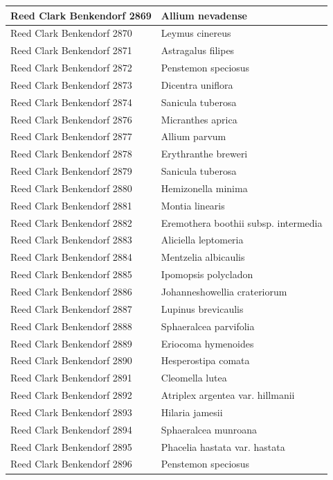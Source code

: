 \documentclass[
]{article}
\begin{document}
\begin{longtable}{l|l}
\hline
Reed Clark Benkendorf 2869 & Allium nevadense\\
\hline
Reed Clark Benkendorf 2870 & Leymus cinereus\\
\hline
Reed Clark Benkendorf 2871 & Astragalus filipes\\
\hline
Reed Clark Benkendorf 2872 & Penstemon speciosus\\
\hline
Reed Clark Benkendorf 2873 & Dicentra uniflora\\
\hline
Reed Clark Benkendorf 2874 & Sanicula tuberosa\\
\hline
Reed Clark Benkendorf 2876 & Micranthes aprica\\
\hline
Reed Clark Benkendorf 2877 & Allium parvum\\
\hline
Reed Clark Benkendorf 2878 & Erythranthe breweri\\
\hline
Reed Clark Benkendorf 2879 & Sanicula tuberosa\\
\hline
Reed Clark Benkendorf 2880 & Hemizonella minima\\
\hline
Reed Clark Benkendorf 2881 & Montia linearis\\
\hline
Reed Clark Benkendorf 2882 & Eremothera boothii subsp. intermedia\\
\hline
Reed Clark Benkendorf 2883 & Aliciella leptomeria\\
\hline
Reed Clark Benkendorf 2884 & Mentzelia albicaulis\\
\hline
Reed Clark Benkendorf 2885 & Ipomopsis polycladon\\
\hline
Reed Clark Benkendorf 2886 & Johanneshowellia crateriorum\\
\hline
Reed Clark Benkendorf 2887 & Lupinus brevicaulis\\
\hline
Reed Clark Benkendorf 2888 & Sphaeralcea parvifolia\\
\hline
Reed Clark Benkendorf 2889 & Eriocoma hymenoides\\
\hline
Reed Clark Benkendorf 2890 & Hesperostipa comata\\
\hline
Reed Clark Benkendorf 2891 & Cleomella lutea\\
\hline
Reed Clark Benkendorf 2892 & Atriplex argentea var. hillmanii\\
\hline
Reed Clark Benkendorf 2893 & Hilaria jamesii\\
\hline
Reed Clark Benkendorf 2894 & Sphaeralcea munroana\\
\hline
Reed Clark Benkendorf 2895 & Phacelia hastata var. hastata\\
\hline
Reed Clark Benkendorf 2896 & Penstemon speciosus\\

\end{longtable}
\end{document}
